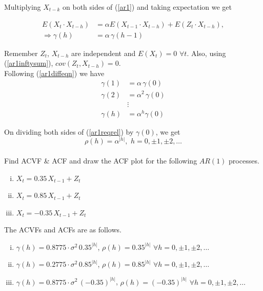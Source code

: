\documentclass[11pt, a4paper]{article}
\begin{document}
Multiplying $X_{t-k}$ on both sides of (\ref{ar1}) and taking expectation we get

\begin{align}\label{ar1diffeqn}
E(X_t \cdot X_{t-h}) &= \alpha E(X_{t-1} \cdot X_{t-h}) + E(Z_{t} \cdot X_{t-h}),  \nonumber \\[0.25em]
\Rightarrow \gamma(h) &= \alpha \, \gamma(h-1)
\end{align}

Remember $Z_t$, $X_{t-h}$ are independent and $E(X_t) = 0$ $\forall t$. Also, using (\ref{ar1inftysum}), $cov(Z_{t}, X_{t-h}) = 0$.\\

Following (\ref{ar1diffeqn}) we have
\begin{align}\label{ar1reqrel}
\gamma(1) &= \alpha \, \gamma(0) \nonumber \\[0.25em]
\gamma(2) &= \alpha^2 \, \gamma(0) \nonumber \\[0.25em]
&\vdots \nonumber \\[0.25em]
\gamma(h) &= \alpha^h \gamma(0)
\end{align}

On dividing both sides of (\ref{ar1reqrel}) by $\gamma(0)$, we get $$\rho(h) = \alpha^{|h|}, \,\, h = 0, \pm 1, \pm 2, \ldots$$ \\

\bclampe \hspace{0.1cm} Find ACVF \& ACF and draw the ACF plot for the following $AR(1)$ processes.
\begin{enumerate}[(i)]
\item $X_t = 0.35 \, X_{t-1} + Z_t$
\item $X_t = 0.85 \, X_{t-1} + Z_t$
\item $X_t = -0.35 \, X_{t-1} + Z_t$
\end{enumerate}

\bcplume \hspace{0.1cm} The ACVFs and ACFs are as follows.
\begin{enumerate}[(i)]
\item $\gamma(h) = 0.8775 \cdot \sigma^2 \, 0.35^{|h|}$, $\rho(h) = 0.35^{|h|}$ $\forall h = 0, \pm 1, \pm 2, \ldots$
\item $\gamma(h) = 0.2775 \cdot \sigma^2 \, 0.85^{|h|}$, $\rho(h) = 0.85^{|h|}$ $\forall h = 0, \pm 1, \pm 2, \ldots$
\item $\gamma(h) = 0.8775 \cdot \sigma^2 \, (-0.35)^{|h|}$, $\rho(h) = (-0.35)^{|h|}$ $\forall h = 0, \pm 1, \pm 2, \ldots$
\end{enumerate}
\end{document}
